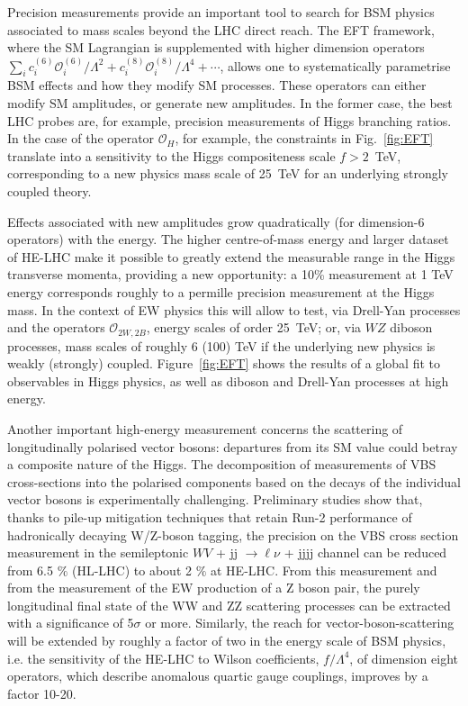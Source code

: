 \documentclass[../report.tex]{subfiles}
\begin{document}
Precision measurements provide an important tool to search for BSM physics associated to mass scales beyond the LHC direct reach. The EFT framework, where the SM Lagrangian is supplemented with higher dimension operators $\sum_{i} c_i^{(6)}\mathcal{O}^{(6)}_i/\Lambda^2+c_i^{(8)}\mathcal{O}^{(8)}_i/\Lambda^4+\cdots$, allows one to systematically parametrise BSM effects and how they modify SM processes. These operators can either modify SM amplitudes, or generate new amplitudes. In the former case, the best LHC probes are, for example, precision measurements of Higgs branching ratios. In the case of the operator $\mathcal{O}_H$, for example, the constraints in Fig.~\ref{fig:EFT} translate into a sensitivity to the Higgs compositeness scale $f>2$~TeV, corresponding to a new physics mass scale of 25~TeV for an underlying strongly coupled theory.

Effects associated with  new amplitudes grow quadratically (for dimension-6 operators) with the energy. The higher centre-of-mass energy and larger dataset of HE-LHC make it possible to greatly extend the measurable range in the Higgs transverse momenta, providing a new opportunity: a 10\% measurement  at 1 TeV energy corresponds roughly to a permille  precision measurement at the Higgs mass. 
In the context of EW physics this will allow  to test, via Drell-Yan processes and  the operators $\mathcal{O}_{2W,2B}$, energy scales of order 25~TeV; or, via $WZ$ diboson processes, mass scales of roughly 6 (100) TeV if the underlying new physics is weakly (strongly) coupled.
Figure~\ref{fig:EFT} shows the results of a global fit  to observables in Higgs physics, as well as diboson and Drell-Yan processes at high energy. 

Another important high-energy measurement concerns the scattering of longitudinally polarised vector bosons: departures from its SM value could betray a composite nature of the Higgs.
The decomposition of measurements of VBS cross-sections into the polarised components based on the decays of the individual vector bosons is experimentally challenging. Preliminary studies show that, thanks to pile-up mitigation techniques that retain Run-2 performance of hadronically decaying W/Z-boson tagging, the precision on the VBS cross section measurement in the semileptonic $W V$ + jj $\to \ell\nu$ + jjjj channel can be reduced from 6.5 $\%$ (HL-LHC) to about 2 $\%$ at HE-LHC. From this measurement and from the measurement of the EW production of a Z boson pair, the purely longitudinal final state of the WW and ZZ scattering processes can be extracted with a significance of 5$\sigma$ or more. Similarly, the reach for vector-boson-scattering will be extended by roughly a factor of two in the energy scale of BSM physics, i.e. the sensitivity of the HE-LHC to Wilson coefficients, $f/\Lambda^4$, of dimension eight operators, which describe anomalous quartic gauge couplings, improves by a factor 10-20.
\end{document}
